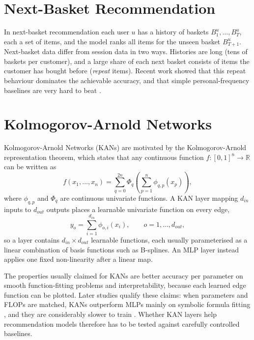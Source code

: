 \section{Next-Basket Recommendation}

In next-basket recommendation each user $u$ has a history of baskets
$B^u_1, \ldots, B^u_{T}$, each a set of items, and the model ranks all items for
the unseen basket $B^u_{T+1}$. Next-basket data differ from session data in two
ways. Histories are long (tens of baskets per customer), and a large share of
each next basket consists of items the customer has bought before (\emph{repeat}
items). Recent work showed that this repeat behaviour dominates the achievable
accuracy, and that simple personal-frequency baselines are very hard to beat
\cite{li2023}.

\section{Kolmogorov-Arnold Networks}

Kolmogorov-Arnold Networks (KANs) \cite{liu2025kan} are motivated by the
Kolmogorov-Arnold representation theorem, which states that any continuous
function $f:[0,1]^n \to \mathbb{R}$ can be written as
\begin{equation}
f(x_1, \ldots, x_n) = \sum_{q=0}^{2n} \Phi_q \left( \sum_{p=1}^{n} \phi_{q,p}(x_p) \right),
\end{equation}
where $\phi_{q,p}$ and $\Phi_q$ are continuous univariate functions. A KAN layer
mapping $d_{in}$ inputs to $d_{out}$ outputs places a learnable univariate
function on every edge,
\begin{equation}
y_o = \sum_{i=1}^{d_{in}} \phi_{o,i}(x_i), \qquad o = 1, \ldots, d_{out},
\end{equation}
so a layer contains $d_{in} \times d_{out}$ learnable functions, each usually
parameterised as a linear combination of basis functions such as B-splines. An
MLP layer instead applies one fixed non-linearity after a linear map.

The properties usually claimed for KANs are better accuracy per parameter on
smooth function-fitting problems and interpretability, because each learned edge
function can be plotted. Later studies qualify these claims: when parameters and
FLOPs are matched, KANs outperform MLPs mainly on symbolic formula fitting
\cite{yu2024}, and they are considerably slower to train \cite{hou2025}. Whether
KAN layers help recommendation models therefore has to be tested against
carefully controlled baselines.

